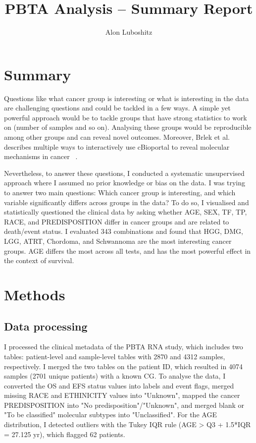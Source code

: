 \documentclass[a4paper,11pt]{article}
\title{PBTA Analysis -- Summary Report}
\author{Alon Luboshitz}
\begin{document}
\maketitle
\section{Summary}
Questions like what cancer group is interesting or what is interesting in the data are challenging questions and 
could be tackled in a few ways. A simple yet powerful approach would be to tackle groups that have strong 
statistics to work on (number of samples and so on). Analysing these groups would be reproducible
among other groups and can reveal novel outcomes. Moreover, Brlek et al. describes multiple ways 
to interactively use cBioportal to reveal molecular mechanisms in cancer ~\cite{cancers13133247}.

Nevertheless, to answer these questions, I conducted a systematic unsupervised approach where
I assumed no prior knowledge or bias on the data. I was trying to answer two main questions: 
Which cancer group is interesting, and which variable significantly differs across groups in the data? 
To do so, I visualised and statistically questioned the clinical data by asking whether AGE, SEX, TF, TP, RACE, and PREDISPOSITION
differ in cancer groups and are related to death/event status.
I evaluated 343 combinations and found that HGG, DMG, LGG, ATRT, Chordoma, and Schwannoma are the most
interesting cancer groups. AGE differs the most across all tests, and has the most powerful effect in the context of survival.


\section{Methods}
\subsection{Data processing}
I processed the clinical metadata of the PBTA RNA study, which includes two tables: patient-level and sample-level tables
with 2870 and 4312 samples, respectively. I merged the two tables on the patient ID, which resulted in 4074 samples
(2701 unique patients) with a known CG. To analyse the data, I converted the OS and EFS status values into labels and event
flags, merged missing RACE and ETHINICITY values into "Unknown", mapped the cancer PREDISPOSITION into 
"No predisposition"/"Unknown", and merged blank or "To be classified" molecular subtypes into "Unclassified". 
For the AGE distribution, I detected outliers with the Tukey IQR rule (AGE > Q3 + 1.5*IQR = 27.125 yr), which flagged 
62 patients.
\end{document}

